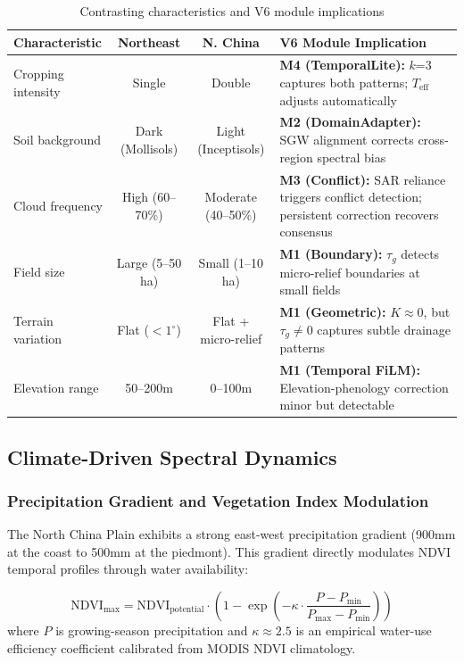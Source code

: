 \begin{table}[h]
\centering
\caption{Contrasting characteristics and V6 module implications}
\begin{tabular}{p{2.8cm}ccp{4.5cm}}
\toprule
\textbf{Characteristic} & \textbf{Northeast} & \textbf{N. China} & \textbf{V6 Module Implication} \\
\midrule
Cropping intensity & Single & Double & \textbf{M4 (TemporalLite):}
$k$=3 captures both patterns; $T_{\text{eff}}$ adjusts automatically \\
Soil background & Dark (Mollisols) & Light (Inceptisols) & \textbf{M2 (DomainAdapter):}
SGW alignment corrects cross-region spectral bias \\
Cloud frequency & High (60--70\%) & Moderate (40--50\%) & \textbf{M3 (Conflict):}
SAR reliance triggers conflict detection; persistent correction recovers consensus \\
Field size & Large (5--50 ha) & Small (1--10 ha) & \textbf{M1 (Boundary):}
$\tau_g$ detects micro-relief boundaries at small fields \\
Terrain variation & Flat ($<1^\circ$) & Flat + micro-relief & \textbf{M1 (Geometric):}
$K\approx0$, but $\tau_g \neq 0$ captures subtle drainage patterns \\
Elevation range & 50--200m & 0--100m & \textbf{M1 (Temporal FiLM):}
Elevation-phenology correction minor but detectable \\
\bottomrule
\end{tabular}
\end{table}

\subsection{Climate-Driven Spectral Dynamics}

\subsubsection{Precipitation Gradient and Vegetation Index Modulation}

The North China Plain exhibits a strong east-west precipitation gradient
(900mm at the coast to 500mm at the piedmont). This gradient directly modulates
NDVI temporal profiles through water availability:

\begin{equation}
    \text{NDVI}_{\max} = \text{NDVI}_{\text{potential}} \cdot
    \left(1 - \exp\left(-\kappa \cdot \frac{P - P_{\min}}{P_{\max} - P_{\min}}\right)\right)
\end{equation}
where $P$ is growing-season precipitation and $\kappa \approx 2.5$ is an
empirical water-use efficiency coefficient calibrated from MODIS NDVI
climatology.


